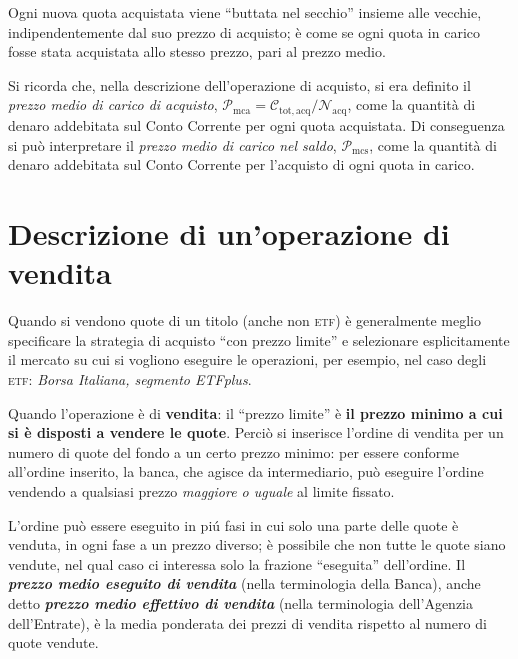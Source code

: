 \documentclass[12pt,a4paper]{article}
\newcommand{\Undefine}[1]{\let#1\CustomUndefined}
\newcommand{\Define}[2]{%
\Undefine{#1}
\newcommand{#1}{#2}
}
\newcommand{\Parentesi}[1]{(#1)}
\newcommand{\Virgolette}[1]{``#1''}
\newcommand{\Etf}[1]{\textsc{etf}}
\newcommand{\Nacq}[1]{\mathcal{N}_{\textrm{acq}#1}}
\newcommand{\Pmc}[1]{\mathcal{P}_{\mathrm{mc}#1}}
\newcommand{\Pmca}[1]{\Pmc{\mathrm{a}#1}}
\newcommand{\Pmcs}[1]{\Pmc{\mathrm{s}#1}}
\newcommand{\Ctotacq}[1]{\mathcal{C}_{\mathrm{tot,acq}#1}}
\begin{document}
Ogni  nuova  quota   acquistata  viene  \Virgolette{buttata  nel  secchio}   insieme  alle  vecchie,
indipendentemente dal suo prezzo di acquisto; è come  se ogni quota in carico fosse stata acquistata
allo stesso prezzo, pari al prezzo medio.

Si ricorda che, nella descrizione dell'operazione di acquisto, si era definito il \emph{prezzo medio
   di carico di acquisto}, \(\Pmca{} = \Ctotacq{} / \Nacq{}\), come la quantità di denaro addebitata
sul Conto Corrente  per ogni quota acquistata.   Di conseguenza si può  interpretare il \emph{prezzo
   medio di carico nel saldo}, \(\Pmcs{}\), come la quantità di denaro addebitata sul Conto Corrente
per l'acquisto di ogni quota in carico.


\section{Descrizione di un'operazione di vendita}



\Define{\UnoNumeroQuote}{20}
\Define{\DueNumeroQuote}{30}
\Define{\TreNumeroQuote}{50}
\Define{\UnoPrezzoEseguito}{52,00}
\Define{\DuePrezzoEseguito}{53,00}
\Define{\TrePrezzoEseguito}{55,00}


Quando si vendono quote di un titolo  \Parentesi{anche non \Etf{}} è generalmente meglio specificare
la strategia di  acquisto \Virgolette{con prezzo limite} e selezionare  esplicitamente il mercato su
cui si vogliono  eseguire le operazioni, per  esempio, nel caso degli  \Etf{}: \emph{Borsa Italiana,
   segmento ETFplus}.

Quando l'operazione è di \textbf{vendita}: il  \Virgolette{prezzo limite} è \textbf{il prezzo minimo
   a cui si è disposti  a vendere le quote}.  Perciò si inserisce l'ordine  di vendita per un numero
di quote del fondo a un certo prezzo  minimo: per essere conforme all'ordine inserito, la banca, che
agisce da intermediario, può eseguire l'ordine  vendendo a qualsiasi prezzo \emph{maggiore o uguale}
al limite fissato.

L'ordine può essere eseguito in piú fasi in cui solo una parte delle quote è venduta, in ogni fase a
un prezzo diverso; è possibile che non tutte le quote siano vendute, nel qual caso ci interessa solo
la frazione \Virgolette{eseguita} dell'ordine.  Il  \textbf{\emph{prezzo medio eseguito di vendita}}
(nella  terminologia della  Banca), anche  detto \textbf{\emph{prezzo  medio effettivo  di vendita}}
(nella terminologia dell'Agenzia dell'Entrate), è la  media ponderata dei prezzi di vendita rispetto
al numero di quote vendute.
\end{document}
